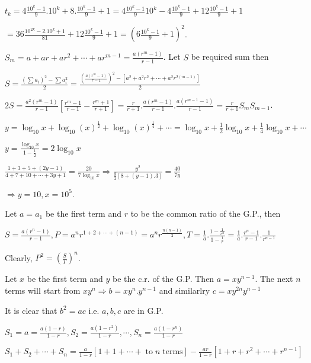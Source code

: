   $t_k = 4\frac{10^k - 1}{9}.10^k + 8.\frac{10^k - 1}{9} + 1 = 4\frac{10^k - 1}{9}10^k - 4\frac{10^k - 1}{9}
  + 12\frac{10^k - 1}{9} + 1$

  $= 36\frac{10^{2k} - 2.10^k + 1}{81} +12\frac{10^k - 1}{9} + 1 = \left(6\frac{10^k - 1}{9} + 1\right)^2$.
\item $S_m = a + ar + ar^2 + \cdots + ar^{m - 1} = \frac{a(r^m - 1)}{r - 1}$. Let $S$ be required sum then

  $S = \frac{\left(\sum a_i\right)^2 - \sum a_i^2}{2} = \frac{\left(\frac{a(r^m - 1)}{r - 1}\right)^2 - [a^2 + a^2r^2 +
    \cdots + a^2r^{2(m - 1)}]}{2}$

  $2S = \frac{a^2(r^m - 1)}{r - 1}\left[\frac{r^m - 1}{r - 1} - \frac{r^m + 1}{r + 1}\right] = \frac{r}{r +
  1}.\frac{a(r^m - 1)}{r - 1}.\frac{a(r^{m - 1} - 1)}{r - 1} = \frac{r}{r + 1}S_mS_{m - 1}$.
\item $y = \log_{10}x + \log_{10}(x)^{\frac{1}{2}} + \log_{10}(x)^{\frac{1}{4}} + \cdots = \log_{10}x +
  \frac{1}{2}\log_{10}x + \frac{1}{4}\log_{10}x + \cdots$

  $y = \frac{\log_{10}x}{1 - \frac{1}{2}} = 2\log_{10}x$

  $\frac{1 + 3 + 5 + (2y - 1)}{4 + 7 + 10 + \cdots + 3y + 1} = \frac{20}{7\log_{10}x} \Rightarrow
  \frac{y^2}{\frac{y}{2}[8 + (y - 1).3]} = \frac{40}{7y}$

  $\Rightarrow y = 10, x = 10^5$.
\item Let $a = a_1$ be the first term and $r$ to be the common ratio of the G.P., then

  $S = \frac{a(r^n - 1)}{r - 1}, P = a^nr^{1 + 2+ \cdots + (n - 1)} = a^nr^{\tfrac{n(n - 1)}{2}}, T =
  \frac{1}{a}.\frac{1 - \tfrac{1}{r^n}}{1 - \tfrac{1}{r}} = \frac{1}{a}.\frac{r^n - 1}{r - 1}.\frac{1}{r^{n -
      1}}$

  Clearly, $P^2 = \left(\frac{S}{T}\right)^n$.
\item Let $x$ be the first term and $y$ be the c.r. of the G.P. Then $a = xy^{n - 1}$. The next $n$ terms
  will start from $xy^n\Rightarrow b = xy^n.y^{n - 1}$ and similarlry $c = xy^{2n}y^{n - 1}$

  It is clear that $b^2 = ac$ i.e. $a, b, c$ are in G.P.
\item $S_1 = a = \frac{a(1 - r)}{1 - r}, S_2 = \frac{a(1 - r^2)}{1 - r}, \cdots, S_n = \frac{a(1 - r^n)}{1 -
  r}$

  $S_1 + S_2 + \cdots + S_n = \frac{a}{1 - r}[1 + 1 + \cdots +\;\mathrm{to}\;n\;\mathrm{terms}] -
  \frac{ar}{1 - r}[1 + r + r^2 + \cdots + r^{n - 1}]$

